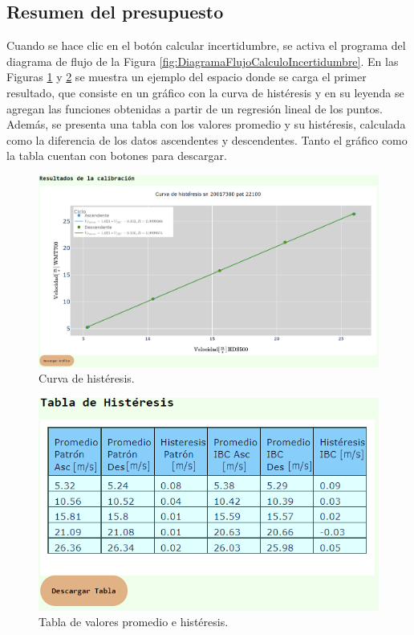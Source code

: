 \subsection{Resumen del presupuesto}\label{sec:Resultados}

Cuando se hace clic en el botón calcular incertidumbre, se activa el programa del diagrama de flujo de la Figura \ref{fig:DiagramaFlujoCalculoIncertidumbre}. En las Figuras \ref{fig:curvaHisteris} y \ref{fig:tablaHisteresis} se muestra un ejemplo del espacio donde se carga el primer resultado, que consiste en un gráfico con la curva de histéresis y en su leyenda se agregan las funciones obtenidas a partir de un regresión lineal de los puntos. Además, se presenta una tabla con los valores promedio y su histéresis, calculada como la diferencia de los datos ascendentes y descendentes. Tanto el gráfico como la tabla cuentan con botones para descargar.

\begin{figure}[H]
    \centering
    \includegraphics[width=1\linewidth]{Figuras/AplicacionWeb/frontend/curvaHisteris.png}
    \caption{Curva de histéresis.}
    \label{fig:curvaHisteris}
\end{figure}

\begin{figure}[H]
    \centering
    \includegraphics[width=0.55\linewidth]{Figuras/AplicacionWeb/frontend/tablaHisteresis.png}
    \caption{Tabla de valores promedio e histéresis.}
    \label{fig:tablaHisteresis}
\end{figure}

